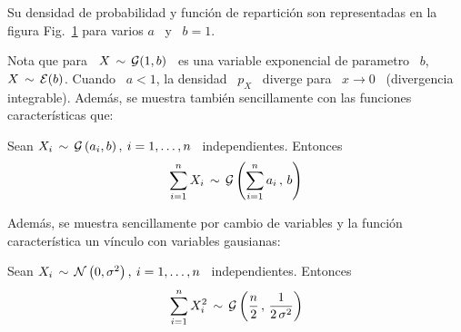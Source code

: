 Su densidad de probabilidad y funci\'on de repartici\'on son representadas en la
figura Fig.~\ref{Fig:MP:Gamma} para varios $a$ \ y \ $b = 1$.
%
\begin{figure}[h!]
\begin{center}  \end{center}
%
\label{Fig:MP:Gamma}
\end{figure}

Nota  que para  \  $X \,  \sim  \, \mathcal{G}(1,b)$  \ es  una  variable exponencial  de
parametro \  $b$, \ie \ $X \,  \sim \, \mathcal{E}(b)$. Cuando  \ $a < 1$,  la densidad \
$p_X$  \ diverge  para \  $x  \to 0$  \ (divergencia  integrable). Adem\'as,  se
muestra tambi\'en sencillamente con las funciones caracter\'isticas que:
%
\begin{lema}[Stabilidad]
\label{Lem:MP:StabilidadGamma}
%
  Sean $X_i  \, \sim  \, \mathcal{G}\left( a_i  , b  \right), \: i  = 1 ,  \ldots ,  n$ \
  independientes. Entonces
  \[
  \sum_{i=1}^n X_i \, \sim \, \mathcal{G}\left( \sum_{i=1}^n a_i \, , \, b \right)
  \]
\end{lema}

Adem\'as,  se muestra  sencillamente  por  cambio de  variables  y la  funci\'on
caracter\'istica un v\'inculo con variables gausianas:
%
\begin{lema}
\label{Lem:MP:VinvuloGammaGaussiana}
%
  Sean $X_i \, \sim \,  \mathcal{N}\left( 0 , \sigma^2 \right), \: i = 1  , \ldots , n$ \
  independientes. Entonces
  \[
  \sum_{i=1}^n  X_i^2 \,  \sim \,  \mathcal{G}\left( \frac{n}{2}  \, ,  \,  \frac{1}{2 \,
      \sigma^2} \right)
  \]
\end{lema}







